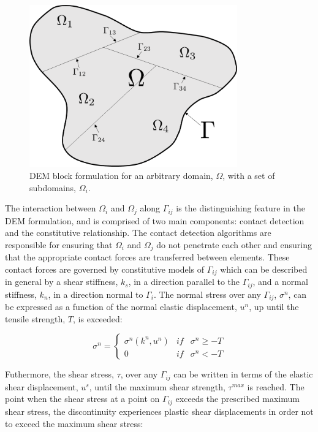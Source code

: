 \begin{figure}[!htb]
\begin{center}
\includegraphics[width=0.8\textwidth]{figures/Chapter3/DEMSchematic}
\caption{{\label{fig:DEM}DEM block formulation for an arbitrary domain, $\Omega$, with a set of subdomains, $\Omega_i$.%
}}
\end{center}
\end{figure}

The interaction between $\Omega_i$ and $\Omega_j$ along $\Gamma_{ij}$ is the distinguishing feature in the DEM formulation, and is comprised of two main components: contact detection and the constitutive relationship. The contact detection algorithms are responsible for ensuring that $\Omega_i$ and $\Omega_j$ do not penetrate each other and ensuring that the appropriate contact forces are transferred between elements. These contact forces are governed by constitutive models of $\Gamma_{ij}$ which can be described in general by a shear stiffness, $k_s$, in a direction parallel to the $\Gamma_{ij}$, and a normal stiffness, $k_n$, in a direction normal to $\Gamma_i$. The normal stress over any $\Gamma_{ij}$, $\sigma^n$, can be expressed as a function of the normal elastic displacement, $u^n$, up until the tensile strength, $T$, is exceeded: 

\begin{equation}
\sigma^n=\left\{\begin{matrix}
\sigma^n\left(k^n, u^n\right) &if& \sigma^n \geq -T\\ 
 0 & if &\sigma^n < -T
\end{matrix}\right.
\label{eqn:demnormal}
\end{equation}

Futhermore, the shear stress, $\tau$, over any $\Gamma_{ij}$ can be written in terms of the elastic shear displacement, $u^s$, until the maximum shear strength, $\tau^{max}$ is reached. The point when the shear stress at a point on $\Gamma_{ij}$ exceeds the prescribed maximum shear stress, the discontinuity experiences plastic shear displacements in order not to exceed the maximum shear stress:

